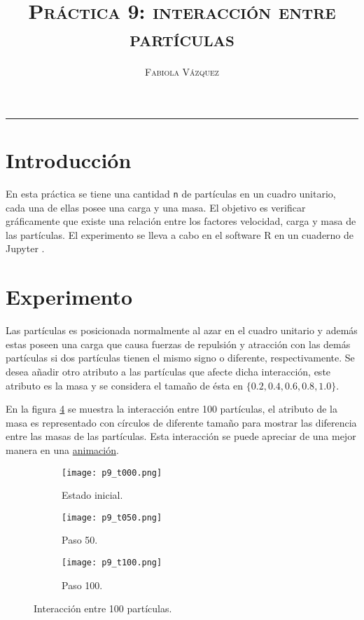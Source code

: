 \documentclass[12pt,letterpaper]{article}
\title{\textsc{Práctica 9: interacción entre partículas}}
\author{\textsc{Fabiola Vázquez}}
\begin{document}
\maketitle

\hrule
\section{Introducción}
En esta práctica \cite{elisapractica9} se tiene una cantidad \texttt{n} de partículas en un cuadro unitario, cada una de ellas posee una carga y una masa. El objetivo es verificar gráficamente que existe una relación entre los factores velocidad, carga y masa de las partículas. El experimento se lleva a cabo en el software R \cite{R} en un cuaderno de Jupyter \cite{jupyter}.

\section{Experimento}
Las partículas es posicionada normalmente al azar en el cuadro unitario y además estas poseen una carga que causa fuerzas de repulsión y atracción con las demás partículas si dos partículas tienen el mismo signo o diferente, respectivamente. Se desea añadir otro atributo a las partículas que afecte dicha interacción, este atributo es la masa y se considera el tamaño de ésta en $\{0.2, 0.4, 0.6, 0.8, 1.0\}.$ 

En la figura \ref{im} se muestra la interacción entre 100 partículas, el atributo de la masa es representado con círculos de diferente tamaño para mostrar las diferencia entre las masas de las partículas. Esta interacción se puede apreciar de una mejor manera en una \href{https://github.com/fvzqa/Simulacion/blob/master/Tarea09/Images/p9.gif}{animación}.
 \begin{figure}
 	\centering 
 	\begin{subfigure}[b]{0.3\linewidth}
 		\texttt{[image: p9\_t000.png]} 		
 		\caption{Estado inicial.}
 		 		\label{1}
 	\end{subfigure}  \hfill
 	\begin{subfigure}[b]{0.3\linewidth}
 		\texttt{[image: p9\_t050.png]} 		
 		\caption{Paso 50.}
 		\label{2}
 	\end{subfigure} \hfill
 	 	\begin{subfigure}[b]{0.3\linewidth}
 		\texttt{[image: p9\_t100.png]} 		
 		\caption{Paso 100.}
 		\label{3}
 	\end{subfigure}
 	 	\caption{Interacción entre 100 partículas.} 
 	 		\label{im}
\end{figure} 
\end{document}

